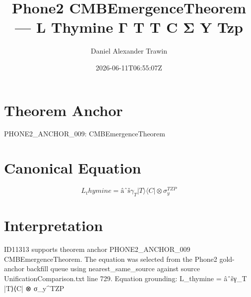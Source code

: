 \documentclass[11pt]{article}
\title{Phone2 CMBEmergenceTheorem — L Thymine Γ T T C Σ Y Tzp}
\author{Daniel Alexander Trawin}
\date{2026-06-11T06:55:07Z}
\begin{document}
\maketitle
\section*{Theorem Anchor}
PHONE2_ANCHOR_009: CMBEmergenceTheorem
\section*{Canonical Equation}
\[
L_thymine = âˆšγ_T |T⟩⟨C| ⊗ σ_y^{TZP}
\]
\section*{Interpretation}
ID11313 supports theorem anchor PHONE2_ANCHOR_009 CMBEmergenceTheorem. The equation was selected from the Phone2 gold-anchor backfill queue using nearest_same_source against source UnificationComparison.txt line 729. Equation grounding: L_thymine = âˆšγ_T |T⟩⟨C| ⊗ σ_y^{TZP}
\end{document}
